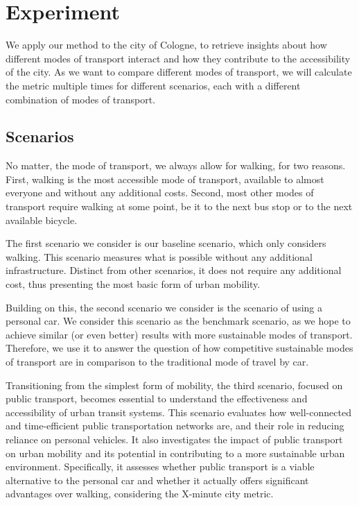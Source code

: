 \clearpage
\section{Experiment}
\label{sec:experiment}

We apply our method to the city of Cologne, to retrieve insights about how different modes of transport interact and how they contribute to the accessibility of the city.
As we want to compare different modes of transport, we will calculate the metric multiple times for different scenarios, each with a different combination of modes of transport.

\subsection{Scenarios}
\label{subs:scenarios}

No matter, the mode of transport, we always allow for walking, for two reasons.
First, walking is the most accessible mode of transport, available to almost everyone and without any additional costs.
Second, most other modes of transport require walking at some point, be it to the next bus stop or to the next available bicycle.

The first scenario we consider is our baseline scenario, which only considers walking.
This scenario measures what is possible without any additional infrastructure. 
Distinct from other scenarios, it does not require any additional cost, thus presenting the most basic form of urban mobility.

Building on this, the second scenario we consider is the scenario of using a personal car.
We consider this scenario as the benchmark scenario, as we hope to achieve similar (or even better) results with more sustainable modes of transport.
Therefore, we use it to answer the question of how competitive sustainable modes of transport are in comparison to the traditional mode of travel by car. 

Transitioning from the simplest form of mobility, the third scenario, focused on public transport, becomes essential to understand the effectiveness and accessibility of urban transit systems. 
This scenario evaluates how well-connected and time-efficient public transportation networks are, and their role in reducing reliance on personal vehicles. 
It also investigates the impact of public transport on urban mobility and its potential in contributing to a more sustainable urban environment. 
Specifically, it assesses whether public transport is a viable alternative to the personal car and whether it actually offers significant advantages over walking, considering the X-minute city metric.


